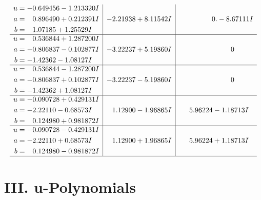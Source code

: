 \documentclass[1p]{elsarticle_modified}
\theoremstyle{definition}
\begin{document}
$$\begin{array}{c|c|c}
\begin{aligned}
u &= -0.649456 - 1.213320 I \\
a &= \phantom{-}0.896490 + 0.212391 I \\
b &= \phantom{-}1.07185 + 1.25529 I\end{aligned}
 & -2.21938 + 8.11542 I & \phantom{-0.000000 } 0. - 8.67111 I \\ \hline\begin{aligned}
u &= \phantom{-}0.536844 + 1.287200 I \\
a &= -0.806837 - 0.102877 I \\
b &= -1.42362 - 1.08127 I\end{aligned}
 & -3.22237 + 5.19860 I & \phantom{-0.000000 } 0 \\ \hline\begin{aligned}
u &= \phantom{-}0.536844 - 1.287200 I \\
a &= -0.806837 + 0.102877 I \\
b &= -1.42362 + 1.08127 I\end{aligned}
 & -3.22237 - 5.19860 I & \phantom{-0.000000 } 0 \\ \hline\begin{aligned}
u &= -0.090728 + 0.429131 I \\
a &= -2.22110 - 0.68573 I \\
b &= \phantom{-}0.124980 + 0.981872 I\end{aligned}
 & \phantom{-}1.12900 - 1.96865 I & \phantom{-}5.96224 - 1.18713 I \\ \hline\begin{aligned}
u &= -0.090728 - 0.429131 I \\
a &= -2.22110 + 0.68573 I \\
b &= \phantom{-}0.124980 - 0.981872 I\end{aligned}
 & \phantom{-}1.12900 + 1.96865 I & \phantom{-}5.96224 + 1.18713 I\\
 \hline 
 \end{array}$$\newpage
\newpage\renewcommand{\arraystretch}{1}
\centering \section*{ III. u-Polynomials}
\end{document}
